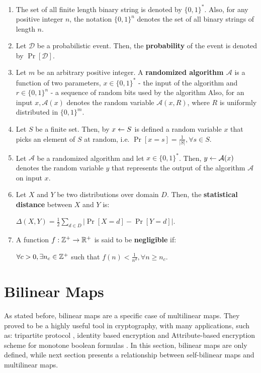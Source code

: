 \begin{enumerate}
	\item The set of all finite length binary string is denoted by $\{0, 1\}^*$. Also, for any positive integer $n$, the notation $\{0,1\}^n$ denotes the set of all binary strings of length $n$. 
	
	\item Let $\mathcal{D}$ be a probabilistic event. Then, the \textbf{probability} of the event is denoted by $\Pr[\mathcal{D}]$. 
	
	\item Let $m$ be an arbitrary positive integer. A \textbf{randomized algorithm $\mathcal{A}$} is a function of two parameters, $x \in \{0,1\}^*$ - the input of the algorithm and $r \in \{0, 1\}^n$ - a sequence of random bits used by the algorithm Also, for an input $x, \mathcal{A}(x)$ denotes the random variable $\mathcal{A}(x, R)$, where $R$ is uniformly distributed in $\{0,1\}^m$.
	
	\item Let $S$ be a finite set. Then, by $x \leftarrow S$ is defined a random variable $x$ that picks an element of $S$ at random, i.e. $\Pr[x = s] = \frac{1}{|S|}, \forall s\in S$.
	
	\item Let $\mathcal{A}$ be a randomized algorithm and let $x \in \{0,1\}^*$. Then, $y \leftarrow \mathcal{A} (x)$ denotes the random variable $y$ that represents the output of the algorithm $\mathcal{A}$ on input $x$.
	
	\item Let $X$ and $Y$ be two distributions over domain $D$. Then, the \textbf{statistical distance} between $X$ and $Y$ is:
	\begin{center}
		$\Delta(X, Y) = \frac{1}{2} \displaystyle{\sum_{d\in D} |\Pr [X=d] - \Pr[Y=d]|}$.
	\end{center}
	
	\item A function $f:{\mathbb Z}^+ \rightarrow \mathbb{R}^+$ is said to be \textbf{negligible} if:
	\begin{center}
		$\forall c > 0, \exists n_c \in {\mathbb Z}^+$ such that $f(n) < \frac{1}{n^d}, \forall n \geq n_c$.
	\end{center}
\end{enumerate}

\section{Bilinear Maps}
As stated before, bilinear maps are a specific case of multilinear maps. They proved to be a highly useful tool in cryptography, with many applications, such as: tripartite protocol \cite{Jou00}, identity based encryption \cite{BoF01} and Attribute-based encryption scheme for monotone boolean formulas \cite{TiD14}. In this section, bilinear maps are only defined, while next section presents a relationship between self-bilinear maps and multilinear maps. \\


